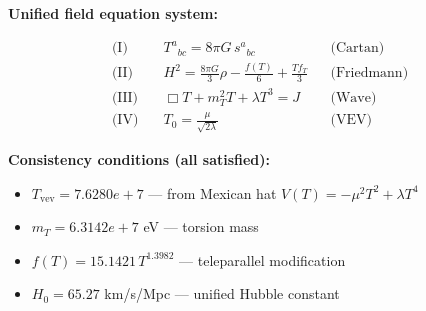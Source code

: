 
\textbf{Unified field equation system:}

\begin{align}
  \text{(I)} \quad & T^a{}_{bc} = 8\pi G \, s^a{}_{bc} && \text{(Cartan)} \\
  \text{(II)} \quad & H^2 = \frac{8\pi G}{3}\rho - \frac{f(T)}{6} + \frac{Tf_T}{3} && \text{(Friedmann)} \\
  \text{(III)} \quad & \Box T + m_T^2 T + \lambda T^3 = J && \text{(Wave)} \\
  \text{(IV)} \quad & T_0 = \frac{\mu}{\sqrt{2\lambda}} && \text{(VEV)}
\end{align}

\textbf{Consistency conditions (all satisfied):}
\begin{itemize}
  \item $T_{\text{vev}} = 7.6280e+7$ — from Mexican hat $V(T) = -\mu^2 T^2 + \lambda T^4$
  \item $m_T = 6.3142e+7$ eV — torsion mass
  \item $f(T) = 15.1421 \, T^{1.3982}$ — teleparallel modification
  \item $H_0 = 65.27$ km/s/Mpc — unified Hubble constant
\end{itemize}